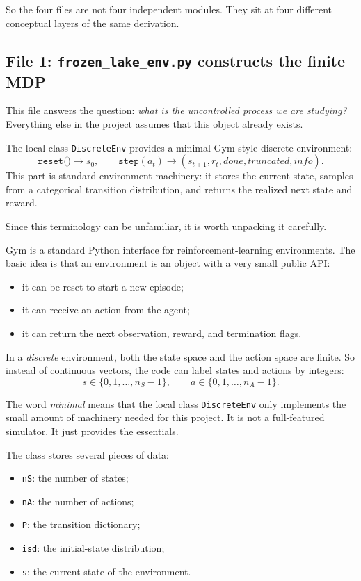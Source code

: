 \documentclass[11pt]{article}
\begin{document}
So the four files are not four independent modules. They sit at four different conceptual
layers of the same derivation.

\subsection*{File 1: \texttt{frozen\_lake\_env.py} constructs the finite MDP}

This file answers the question: \emph{what is the uncontrolled process we are studying?}
Everything else in the project assumes that this object already exists.

The local class \texttt{DiscreteEnv} provides a minimal Gym-style discrete environment:
\begin{equation}
    \texttt{reset()} \to s_0,
    \qquad
    \texttt{step}(a_t) \to (s_{t+1}, r_t, done, truncated, info).
\end{equation}
This part is standard environment machinery: it stores the current state, samples from a
categorical transition distribution, and returns the realized next state and reward.

Since this terminology can be unfamiliar, it is worth unpacking it carefully.

Gym is a standard Python interface for reinforcement-learning environments. The basic idea is
that an environment is an object with a very small public API:
\begin{itemize}
    \item it can be reset to start a new episode;
    \item it can receive an action from the agent;
    \item it can return the next observation, reward, and termination flags.
\end{itemize}

In a \emph{discrete} environment, both the state space and the action space are finite. So
instead of continuous vectors, the code can label states and actions by integers:
\begin{equation}
    s \in \{0,1,\dots,n_S-1\},
    \qquad
    a \in \{0,1,\dots,n_A-1\}.
\end{equation}

The word \emph{minimal} means that the local class \texttt{DiscreteEnv} only implements the
small amount of machinery needed for this project. It is not a full-featured simulator. It
just provides the essentials.

The class stores several pieces of data:
\begin{itemize}
    \item \texttt{nS}: the number of states;
    \item \texttt{nA}: the number of actions;
    \item \texttt{P}: the transition dictionary;
    \item \texttt{isd}: the initial-state distribution;
    \item \texttt{s}: the current state of the environment.
\end{itemize}
\end{document}
